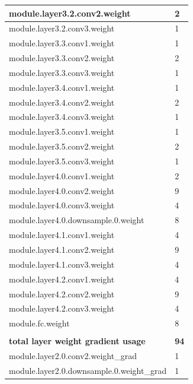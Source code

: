 \documentclass[12pt,letterpaper]{article}
\begin{document}
\begin{appendices}
\begin{longtable}{@{}ll@{}}
module.layer3.2.conv2.weight              & 2    \\ \midrule
module.layer3.2.conv3.weight              & 1    \\ \midrule
module.layer3.3.conv1.weight              & 1    \\ \midrule
module.layer3.3.conv2.weight              & 2    \\ \midrule
module.layer3.3.conv3.weight              & 1    \\ \midrule
module.layer3.4.conv1.weight              & 1    \\ \midrule
module.layer3.4.conv2.weight              & 2    \\ \midrule
module.layer3.4.conv3.weight              & 1    \\ \midrule
module.layer3.5.conv1.weight              & 1    \\ \midrule
module.layer3.5.conv2.weight              & 2    \\ \midrule
module.layer3.5.conv3.weight              & 1    \\ \midrule
module.layer4.0.conv1.weight              & 2    \\ \midrule
module.layer4.0.conv2.weight              & 9    \\ \midrule
module.layer4.0.conv3.weight              & 4    \\ \midrule
module.layer4.0.downsample.0.weight       & 8    \\ \midrule
module.layer4.1.conv1.weight              & 4    \\ \midrule
module.layer4.1.conv2.weight              & 9    \\ \midrule
module.layer4.1.conv3.weight              & 4    \\ \midrule
module.layer4.2.conv1.weight              & 4    \\ \midrule
module.layer4.2.conv2.weight              & 9    \\ \midrule
module.layer4.2.conv3.weight              & 4    \\ \midrule
module.fc.weight                          & 8    \\ \midrule
                                          &      \\ \midrule
\textbf{total layer weight gradient usage}           & \textbf{94}  \\ \midrule
module.layer2.0.conv2.weight\_grad        & 1    \\ \midrule
module.layer2.0.downsample.0.weight\_grad & 1    \\ \midrule

\end{longtable}
\end{appendices}
\end{document}
